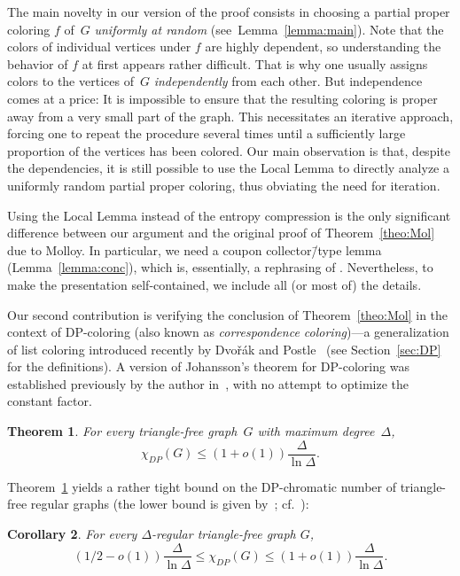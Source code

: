 \documentclass[11pt, reqno, psamsfonts]{amsart}
\newtheorem{theo}{Theorem}[section]
\newtheorem{corl}[theo]{Corollary}
\theoremstyle{definition}
\theoremstyle{remark}
\newcommand{\0}{\varnothing}
\renewcommand{\leq}{\leqslant}
\numberwithin{equation}{section}
\begin{document}
	The main novelty in our version of the proof consists in choosing a partial proper coloring $f$ of~$G$ \emph{uniformly at random} (see~Lemma~\ref{lemma:main}). Note that the colors of individual vertices under $f$ are highly dependent, so understanding the behavior of $f$ at first appears rather difficult. That is why one usually assigns colors to the vertices of~$G$ \emph{independently} from each other. But independence comes at a price: It is impossible to ensure that the resulting coloring is proper away from a very small part of the graph. This necessitates an iterative approach, forcing one to repeat the procedure several times until a sufficiently large proportion of the vertices has been colored. Our main observation is that, despite the dependencies, it is still possible to use the Local Lemma to directly analyze a uniformly random partial proper coloring, thus obviating the need for iteration.
	
	Using the Local Lemma instead of the entropy compression is the only significant difference between our argument and the original proof of Theorem~\ref{theo:Mol} due to Molloy. In particular, we need a coupon collector\=/type lemma (Lemma~\ref{lemma:conc}), which is, essentially, a rephrasing of \cite[Lemma~7]{Mol17}. Nevertheless, to make the presentation self-contained, we include all (or most of) the details.
	
	Our second contribution is verifying the conclusion of Theorem~\ref{theo:Mol} in the context of DP-coloring (also known as \emph{correspondence coloring})---a generalization of list coloring introduced recently by Dvo\v{r}\'{a}k and Postle~\cite{DP} (see Section~\ref{sec:DP} for the definitions). A version of Johansson's theorem for DP-coloring was established previously by the author in~\cite[Theorem~1.7]{Ber}, with no attempt to optimize the constant factor.
	
	\begin{theo}\label{theo:main}
		For every triangle-free graph~$G$ with maximum degree~$\Delta$,
		\[
		\chi_{DP}(G) \leq (1+o(1)) \frac{\Delta}{\ln \Delta}.
		\]
	\end{theo}
	
	
	Theorem~\ref{theo:main} yields a rather tight bound on the DP-chromatic number of triangle-free regular graphs (the lower bound is given by~\cite[Theorem~1.6]{Ber}; cf.~\cite[Corollary~1.8]{Ber}):
	
	\begin{corl}
		For every $\Delta$-regular triangle-free graph $G$,
		\[
			(1/2-o(1))\frac{\Delta}{\ln \Delta} \leq \chi_{DP}(G) \leq (1+o(1)) \frac{\Delta}{\ln \Delta}.
		\]
	\end{corl}
	
\end{document}
